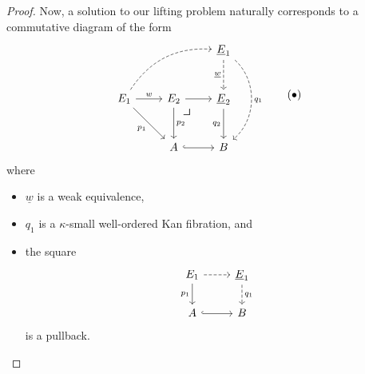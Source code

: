 \documentclass[10pt,letterpaper,cm]{nupset}
\theoremstyle{definition}
\theoremstyle{theorem}
\theoremstyle{remark}
\newcommand{\0}{\mathbf{0}}
\newcommand{\1}{\mathbf{1}}
\newcommand{\2}{\mathbf{2}}
\newcommand{\bi}{\begin{itemize}}
\newcommand{\ei}{\end{itemize}}
\begin{document}
\begin{proof}
Now, a solution to our lifting problem naturally corresponds  to a  commutative diagram of the form
\[ \label{uglydiag}
\begin{tikzcd}[row sep=large]
                                                                     &                                & \underline{E}_1 \arrow[d, "\underline{w}"', dashed] \arrow[dd, "q_1", dashed, bend left=49] \\
E_1 \arrow[r, "w"] \arrow[rd, "p_1"'] \arrow[rru, dashed, bend left] & E_2 \arrow[d, "p_2"] \arrow[r] \arrow[dr, phantom, "\scalebox{1.5}{\color{black}$\lrcorner$}" , very near start, color=black]
& \underline{E}_2 \arrow[d, "q_2"']                                               \\
                                                                     & A \arrow[r, hook]              & B                                                                  
\end{tikzcd} \tag{$\bullet$}
\] where
\bi
\item $\underline{w}$ is a weak equivalence,
\item $q_1$ is a $\kappa$-small well-ordered Kan fibration, and
\item the square
\[
\begin{tikzcd}
E_1 \arrow[d, "p_1"'] \arrow[r, dashed] & \underline{E}_1 \arrow[d, "q_1", dashed] \\
A \arrow[r, hook]                       & B                           
\end{tikzcd}
\] is a pullback.
\ei

\medskip




\end{proof}
\end{document}
